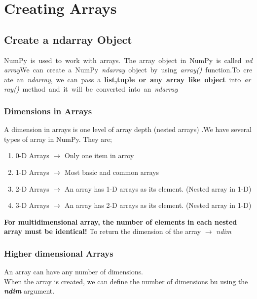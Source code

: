 \documentclass[openany]{book}
\begin{document}
\chapter{Creating Arrays}
\section{Create a ndarray Object}


\hbox{NumPy is used to work with arrays. The array object in NumPy is called \emph{ndarray} \\
We can create a NumPy \emph{ndarray} object by using \emph{array()} function. \\ \\
To create an \emph{ndarray}, we can pass a \textbf{list,tuple or any array like object} into \emph{array()} method and it will be converted into an \emph{ndarray} }

\subsection{Dimensions in Arrays}
A dimension in arrays is one level of array depth (nested arrays)
.We have several types of array in NumPy. They are;

\begin{enumerate}
    \item 0-D Arrays $\rightarrow$ Only one item in arroy
    \item 1-D Arrays  $\rightarrow$ Most basic and common arrays
    \item 2-D Arrays  $\rightarrow$ An array has 1-D  arrays as its element. (Nested array in 1-D)
    \item 3-D Arrays  $\rightarrow$ An array has 2-D  arrays as its element. (Nested array in 1-D)
\end{enumerate}

\textbf{For multidimensional array, the number of elements in each nested array must be identical!}
To return the dimension of the array $\rightarrow$ \textit{ndim}

\subsection{Higher dimensional Arrays}

An array can have any number of dimensions. \\
When the array is created, we can define the number of dimensions bu using the \textbf{\textit{ndim}} argument.
\end{document}
